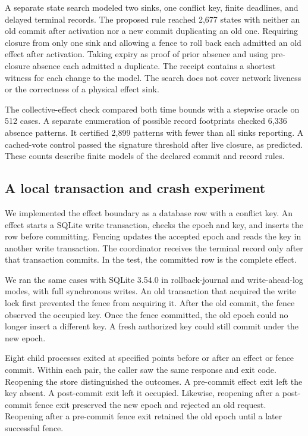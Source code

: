 \documentclass[11pt]{article}
\begin{document}
A separate state search modeled two sinks, one conflict key,
finite deadlines, and delayed terminal records. The proposed
rule reached 2,677 states with neither an old commit after
activation nor a new commit duplicating an old one. Requiring
closure from only one sink and allowing a fence to roll back
each admitted an old effect after activation. Taking expiry
as proof of prior absence and using pre-closure absence each
admitted a duplicate. The receipt contains a shortest witness
for each change to the model. The search does not cover
network liveness or the correctness of a physical effect sink.

The collective-effect check compared both time bounds with a
stepwise oracle on 512 cases. A separate enumeration of possible
record footprints checked 6,336 absence patterns. It certified
2,899 patterns with fewer than all sinks reporting. A cached-vote
control passed the signature threshold after live closure, as
predicted. These counts describe finite models of the declared
commit and record rules.

\subsection{A local transaction and crash experiment}
We implemented the effect boundary as a database row with a
conflict key. An effect starts a SQLite write transaction,
checks the epoch and key, and inserts the row before committing.
Fencing updates the accepted epoch and reads the key in another
write transaction. The coordinator receives the terminal record
only after that transaction commits. In the test, the committed
row is the complete effect.

We ran the same cases with SQLite 3.54.0 in rollback-journal
and write-ahead-log modes, with full synchronous writes. An old
transaction that acquired the write lock first prevented the
fence from acquiring it. After the old commit, the fence observed
the occupied key. Once the fence committed, the old epoch could
no longer insert a different key. A fresh authorized key could
still commit under the new epoch.

Eight child processes exited at specified points before or after
an effect or fence commit. Within each pair, the caller saw the
same response and exit code. Reopening the store distinguished
the outcomes. A pre-commit effect exit left the key absent.
A post-commit exit left it occupied. Likewise, reopening after
a post-commit fence exit preserved the new epoch and rejected
an old request. Reopening after a pre-commit fence exit retained
the old epoch until a later successful fence.
\end{document}
